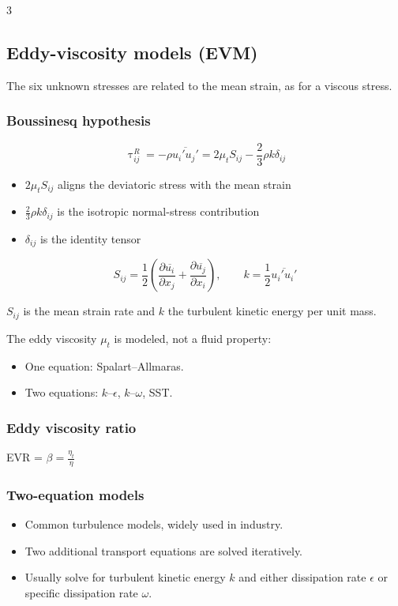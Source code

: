 \documentclass[landscape, a4paper]{article}
\renewcommand{\tau}{\uptau}
\newcommand{\dm}{\displaystyle}
\begin{document}
\begin{multicols*}{3}
\subsection{Eddy-viscosity models (EVM)}
The six unknown stresses are related to the mean strain, as for a viscous stress.

\subsubsection{Boussinesq hypothesis}
\[
  \tau_{ij}^{R}=-\rho\overline{u_i'u_j'}
  =2\mu_t S_{ij}-\frac{2}{3}\rho k\delta_{ij}
\]
\begin{itemize}
  \item $2\mu_t S_{ij}$ aligns the deviatoric stress with the mean strain
  \item $\frac{2}{3}\rho k\delta_{ij}$ is the isotropic normal-stress contribution
  \item $\delta_{ij}$ is the identity tensor
\end{itemize}
\[
  S_{ij}=\frac{1}{2}\left(
    \frac{\partial\overline{u_i}}{\partial x_j}
    +\frac{\partial\overline{u_j}}{\partial x_i}
  \right),
  \qquad k=\frac{1}{2}\overline{u_i'u_i'}
\]

$S_{ij}$ is the mean strain rate and $k$ the turbulent kinetic energy per unit mass.

The eddy viscosity $\mu_t$ is modeled, not a fluid property:
\begin{itemize}
  \item One equation: Spalart--Allmaras.
  \item Two equations: $k$--$\epsilon$, $k$--$\omega$, SST.
\end{itemize}

\subsubsection{Eddy viscosity ratio}
EVR = $\dm \beta = \frac{\eta_t}{\eta}$

\subsubsection{Two-equation models}
\begin{itemize}
  \item Common turbulence models, widely used in industry.
  \item Two additional transport equations are solved iteratively.
  \item Usually solve for turbulent kinetic energy $k$ and either dissipation rate $\epsilon$ or specific dissipation rate $\omega$.
\end{itemize}


\end{multicols*}
\end{document}
